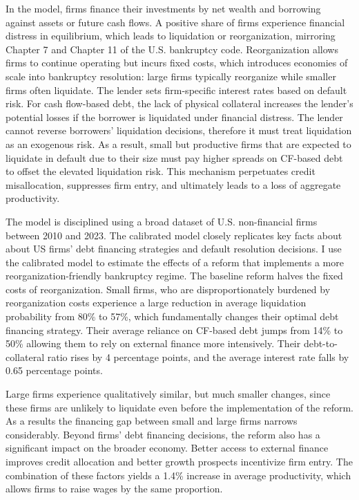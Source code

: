 \documentclass[12pt]{article}
\begin{document}
In the model, firms finance their investments by net wealth and borrowing against assets or future cash flows. A positive share of firms experience financial distress in equilibrium, which leads to liquidation or reorganization, mirroring Chapter 7 and Chapter 11 of the U.S. bankruptcy code. Reorganization allows firms to continue operating but incurs fixed costs, which introduces economies of scale into bankruptcy resolution: large firms typically reorganize while smaller firms often liquidate. The lender sets firm-specific interest rates based on default risk. For cash flow-based debt, the lack of physical collateral increases the lender's potential losses if the borrower is liquidated under financial distress. The lender cannot reverse borrowers’ liquidation decisions, therefore it must treat liquidation as an exogenous risk. As a result, small but productive firms that are expected to liquidate in default due to their size must pay higher spreads on CF-based debt to offset the elevated liquidation risk. This mechanism perpetuates credit misallocation, suppresses firm entry, and ultimately leads to a loss of aggregate productivity.

The model is disciplined using a broad dataset of U.S. non-financial firms between 2010 and 2023. The calibrated model closely replicates key facts about about US firms' debt financing strategies and default resolution decisions. I use the calibrated model to estimate the effects of a reform that implements a more reorganization-friendly bankruptcy regime. The baseline reform halves the fixed costs of reorganization. Small firms, who are disproportionately burdened by reorganization costs experience a large reduction in average liquidation probability from 80\% to 57\%, which fundamentally changes their optimal debt financing strategy. Their average reliance on CF-based debt jumps from 14\% to 50\% allowing them to rely on external finance more intensively. Their debt-to-collateral ratio rises by 4 percentage points, and the average interest rate falls by 0.65 percentage points. 

Large firms experience qualitatively similar, but much smaller changes, since these firms are unlikely to liquidate even before the implementation of the reform. As a results the financing gap between small and large firms narrows considerably. Beyond firms' debt financing decisions, the reform also has a significant impact on the broader economy. Better access to external finance improves credit allocation and better growth prospects incentivize firm entry. The combination of these factors yields a 1.4\% increase in average productivity, which allows firms to raise wages by the same proportion.
\end{document}
